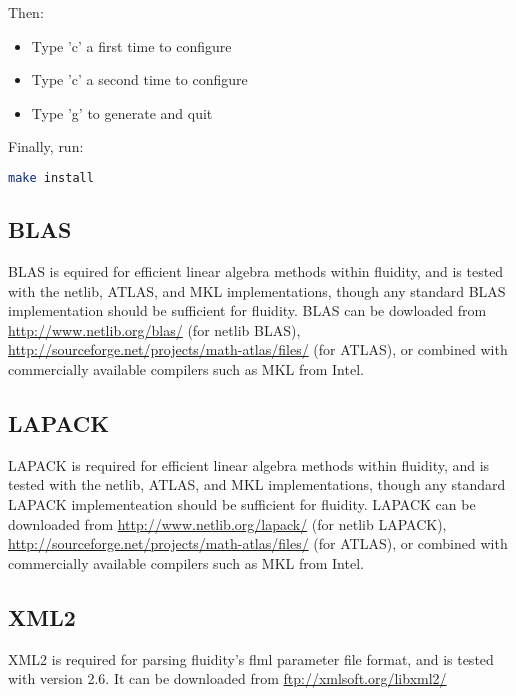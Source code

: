 Then:

\begin{itemize}
  \item Type 'c' a first time to configure
  \item Type 'c' a second time to configure
  \item Type 'g' to generate and quit
\end{itemize}

Finally, run:

\begin{lstlisting}[language=bash]
make install
\end{lstlisting}

\subsection{BLAS}
\label{sect:required_libraries_blas}

BLAS is equired for efficient linear algebra methods within fluidity, and is
tested with the netlib, ATLAS, and MKL implementations, though any standard
BLAS implementation should be sufficient for fluidity. BLAS can be dowloaded
from \url{http://www.netlib.org/blas/} (for netlib BLAS),
\url{http://sourceforge.net/projects/math-atlas/files/} (for ATLAS), or
combined with commercially available compilers such as MKL from Intel.

\subsection{LAPACK}
\label{sect:required_libraries_lapack}

LAPACK is required for efficient linear algebra methods within fluidity, and
is tested with the netlib, ATLAS, and MKL implementations, though any standard
LAPACK implementeation should be sufficient for fluidity. LAPACK can be
downloaded from \url{http://www.netlib.org/lapack/} (for netlib LAPACK),
\url{http://sourceforge.net/projects/math-atlas/files/} (for ATLAS), or
combined with commercially available compilers such as MKL from Intel. 

\subsection{XML2}
\label{sect:required_libraries_xml2}

XML2 is required for parsing fluidity's flml parameter file format, and is
tested with version 2.6. It can be downloaded from \url{ftp://xmlsoft.org/libxml2/}

